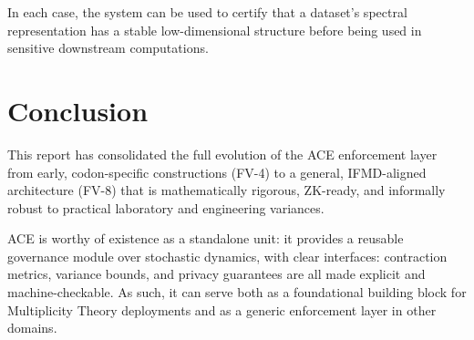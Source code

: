 \documentclass[11pt]{article}
\begin{document}
In each case, the system can be used to certify that a dataset's spectral representation has a stable low-dimensional structure before being used in sensitive downstream computations.

\section{Conclusion}

This report has consolidated the full evolution of the ACE enforcement layer from early, codon-specific constructions (FV-4) to a general, IFMD-aligned architecture (FV-8) that is mathematically rigorous, ZK-ready, and informally robust to practical laboratory and engineering variances.

ACE is worthy of existence as a standalone unit: it provides a reusable governance module over stochastic dynamics, with clear interfaces:
contraction metrics, variance bounds, and privacy guarantees are all made explicit and machine-checkable. As such, it can serve both as a foundational building block for Multiplicity Theory deployments and as a generic enforcement layer in other domains.

\nocite{*}

 
\end{document}
